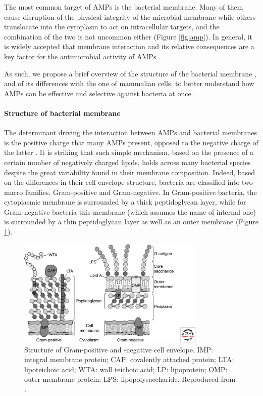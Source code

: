 The most common target of AMPs is the bacterial membrane. Many of them cause disruption of the physical integrity of the microbial membrane while others translocate into the cytoplasm to act on intracellular targets, and the combination of the two is not uncommon either \citep{Hancock2006} (Figure \ref{fig:amp}). In general, it is widely accepted that membrane interaction and its relative consequences are a key factor for the antimicrobial activity of AMPs \citep{Nguyen2011}.

As such, we propose a brief overview of the structure of the bacterial membrane \citep{Silhavy2010}, and of its differences with the one of mammalian cells, to better understand how AMPs can be effective and selective against bacteria at once.


\paragraph{Structure of bacterial membrane}
The determinant driving the interaction between AMPs and bacterial membranes is the positive charge that many AMPs present, opposed to the negative charge of the latter \citep{Nguyen2011,Mahlapuu2016}.
%
It is striking that such simple mechanism, based on the presence of a certain number of negatively charged lipids, holds across many bacterial species despite the great variability found in their membrane composition.
%
Indeed, based on the differences in their cell envelope structure, bacteria are classified into two macro families, Gram-positive and Gram-negative.
%
In Gram-positive bacteria, the cytoplasmic membrane is surrounded by a thick peptidoglycan layer, while for Gram-negative bacteria this membrane (which assumes the name of internal one) is surrounded by a thin peptidoglycan layer as well as an outer membrane \citep{Silhavy2010,Lin2016} (Figure \ref{fig:membranes}).

\begin{figure}[t!]
\begin{center}
\includegraphics[width = 0.8\textwidth]{1introduction/pics/bacterial_membrane.jpg}
\caption[Structure of Gram-positive and -negative cell envelope.]{Structure of Gram-positive and -negative cell envelope. IMP: integral membrane protein; CAP: covalently attached protein; LTA: lipoteichoic acid; WTA: wall teichoic acid; LP: lipoprotein; OMP: outer membrane protein; LPS: lipopolysaccharide. Reproduced from \citet{Silhavy2010}.} \label{fig:membranes}
\end{center}
\end{figure}

